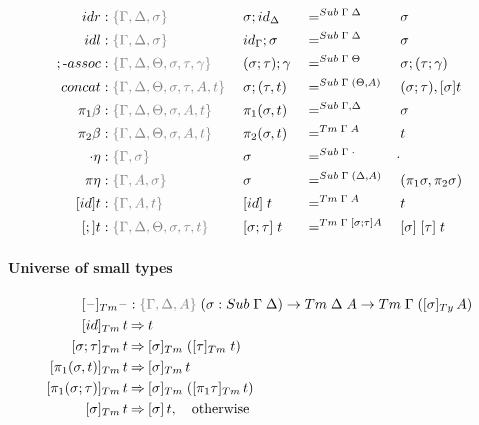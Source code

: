\documentclass[a4paper,UKenglish,numberwithinsect,cleveref,thm-restate]{lipics-v2021}
\begin{document}
\begin{alignat*}{5}
  \mathsf{idr}    & : \implicit{\Gamma, \Delta, \sigma}\; && {\sigma ; \idS_{\Delta}} && =^{\Sub\;\Gamma\;\Delta} && {\sigma} \\
  \mathsf{idl}    & : \implicit{\Gamma, \Delta, \sigma}\; && {\idS_{\Gamma} ; \sigma} && =^{\Sub\;\Gamma\;\Delta} && {\sigma} \\
  ;\text{-}\mathsf{assoc} & : \implicit{\Gamma, \Delta, \Theta, \sigma, \tau, \gamma}\; && (\sigma ; \tau) ; \gamma && =^{\Sub\;\Gamma\;\Theta} &&  \sigma ; (\tau ; \gamma) \\
  \mathsf{concat} & : \implicit{\Gamma, \Delta, \Theta, \sigma, \tau, A, t}\; &&\sigma ; (\tau , t) && =^{\Sub\;\Gamma\;(\Theta, A)} &&  (\sigma ; \tau) , [ \sigma ] t \\
  \pi_1\beta      & : \implicit{\Gamma, \Delta, \Theta, \sigma, A, t}\; && \pi_1(\sigma , t)        && =^{\Sub\;\Gamma,\Delta} &&  \sigma \\
  \pi_2\beta      & : \implicit{\Gamma, \Delta, \Theta, \sigma, A, t}\; && \pi_2(\sigma , t)        && =^{\Tm\;\Gamma\; A} &&  t \\
  \emptyctx\eta   & : \implicit{\Gamma, \sigma}\; && \sigma                   && =^{\Sub\;\Gamma\;\emptyctx} & \emptysub \\
  \pi\eta         & : \implicit{\Gamma, A, \sigma}\; && \sigma                   && =^{\Sub\;\Gamma\;(\Delta, A)} &&  (\pi_1 \sigma, \pi_2 \sigma) \\
  [\idS]t         & : \implicit{\Gamma, A, t}\; && {[\idS]\;t}          && =^{\Tm\;\Gamma\;A} && t \\
  [;]t            & :\implicit{\Gamma, \Delta, \Theta, \sigma, \tau, t}\; && {[\sigma ; \tau]\;t} && =^{\Tm\;\Gamma\;[\sigma ; \tau] A} && {[ \sigma ]\;[ \tau ]\;t}
\end{alignat*}

\paragraph*{Universe of small types}
\begin{alignat*}{5}
  [\blank]_{\Tm}\blank            & : \implicit{\Gamma, \Delta, A}\; (\sigma : \Sub\;\Gamma\;\Delta) \to \Tm\;\Delta\;A \to \Tm\;\Gamma\;([\sigma]_{\Ty}\,A) \\ 
 [ \idS ]_{\Tm}\,t                & \reduce t \\
 [ \sigma ; \tau ]_{\Tm}\,t       & \reduce [ \sigma ]_{\Tm}\;([ \tau ]_{\Tm}\;t) \\
 [ \pi_1(\sigma, t) ]_{\Tm}\,t    & \reduce [\sigma]_\Tm\,t \\
 [ \pi_1(\sigma; \tau) ]_{\Tm}\,t & \reduce [\sigma]_\Tm\; ([\pi_1\tau]_\Tm \,t) \\
 [ \sigma ]_{\Tm}\,t              & \reduce [ \sigma ]\,t, \quad \text{otherwise}
\end{alignat*}
\end{document}
